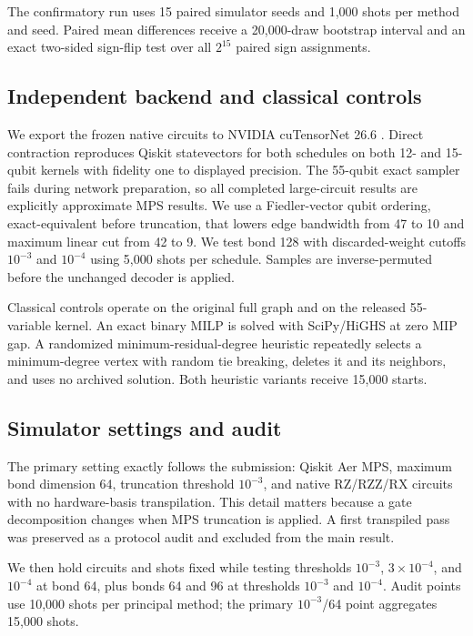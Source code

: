 \documentclass[10pt,twocolumn]{article}
\begin{document}
The confirmatory run uses 15 paired simulator seeds and 1,000 shots per method
and seed. Paired mean differences receive a 20,000-draw bootstrap interval and
an exact two-sided sign-flip test over all $2^{15}$ paired sign assignments.

\subsection{Independent backend and classical controls}

We export the frozen native circuits to NVIDIA cuTensorNet 26.6
\cite{cuquantum}. Direct contraction reproduces Qiskit statevectors for both
schedules on both 12- and 15-qubit kernels with fidelity one to displayed
precision. The 55-qubit exact sampler fails during network preparation, so all
completed large-circuit results are explicitly approximate MPS results. We use
a Fiedler-vector qubit ordering, exact-equivalent before truncation, that lowers
edge bandwidth from 47 to 10 and maximum linear cut from 42 to 9. We test bond
128 with discarded-weight cutoffs $10^{-3}$ and $10^{-4}$ using 5,000 shots per
schedule. Samples are inverse-permuted before the unchanged decoder is applied.

Classical controls operate on the original full graph and on the released
55-variable kernel. An exact binary MILP is solved with SciPy/HiGHS at zero MIP
gap. A randomized minimum-residual-degree heuristic repeatedly selects a
minimum-degree vertex with random tie breaking, deletes it and its neighbors,
and uses no archived solution. Both heuristic variants receive 15,000 starts.

\subsection{Simulator settings and audit}

The primary setting exactly follows the submission: Qiskit Aer MPS, maximum
bond dimension 64, truncation threshold $10^{-3}$, and native RZ/RZZ/RX
circuits with no hardware-basis transpilation. This detail matters because a
gate decomposition changes when MPS truncation is applied. A first transpiled
pass was preserved as a protocol audit and excluded from the main result.

We then hold circuits and shots fixed while testing thresholds $10^{-3}$,
$3\times10^{-4}$, and $10^{-4}$ at bond 64, plus bonds 64 and 96 at thresholds
$10^{-3}$ and $10^{-4}$. Audit points use 10,000 shots per principal method;
the primary $10^{-3}$/64 point aggregates 15,000 shots.
\end{document}
